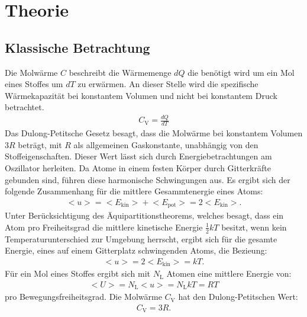 \section{Theorie}
\label{sec:Theorie}

\cite{sample}
\subsection{Klassische Betrachtung}
Die Molwärme $C$ beschreibt die Wärmemenge $dQ$
die benötigt wird um ein Mol eines Stoffes um $dT$ zu erwärmen.
An dieser Stelle wird die spezifische Wärmekapazität bei konstantem Volumen und nicht bei
konstantem Druck betrachtet.
\begin{align}
  C_{\mathrm{V}}=\frac{dQ}{dT}
\end{align}
Das Dulong-Petitsche Gesetz besagt, dass die Molwärme bei konstantem Volumen
$3R$ beträgt, mit $R$ als allgemeinen Gaskonstante, unabhängig von den Stoffeigenschaften.
Dieser Wert lässt sich durch Energiebetrachtungen am Oszillator herleiten. Da Atome in einem
festen Körper durch Gitterkräfte gebunden sind, führen diese harmonische Schwingungen
aus. Es ergibt sich der folgende Zusammenhang für die mittlere Gesammtenergie
eines Atoms:
\begin{align}
  \bigl<u\bigr>=\bigl<E_{\mathrm{kin}}\bigr>+\bigl<E_{\mathrm{pot}}\bigr>=2\bigl<E_{\mathrm{kin}}\bigr>.
\end{align}
Unter Berücksichtigung des Äquipartitionstheorems, welches besagt, dass ein Atom
pro Freiheitsgrad die mittlere kinetische Energie $\frac{1}{2}kT$ besitzt,
wenn kein Temperaturunterschied zur Umgebung herrscht, ergibt sich für
die gesamte Energie, eines auf einem Gitterplatz schwingenden Atoms, die Bezieung:
\begin{align}
  \bigl<u\bigr>=2\bigl<E_{\mathrm{kin}}\bigr>=kT.
\end{align}
Für ein Mol eines Stoffes ergibt sich mit $N_\mathrm{L}$ Atomen eine mittlere Energie von:
\begin{align}
  \bigl<U\bigr>=N_{\mathrm{L}}\bigl<u\bigr>=N_{\mathrm{L}}kT=RT
\end{align}
pro Bewegungsfreiheitsgrad.
Die Molwärme $C_{\mathrm{V}}$ hat den Dulong-Petitschen Wert:
\begin{align}
  C_{\mathrm{V}}=3R.
\end{align}\\
